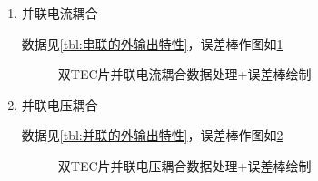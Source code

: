 \documentclass[dvipsnames, svgnames,a4paper,11pt]{article}
\begin{document}
        \begin{enumerate}


            \item 并联电流耦合

                数据见\cref{tbl:串联的外输出特性}，误差棒作图如\cref{fig:双TEC片并联电流耦合数据处理}


                \begin{figure}[htbp]
                    \centering
                    \hfill
                    \caption{双TEC片并联电流耦合数据处理+误差棒绘制}
                    \label{fig:双TEC片并联电流耦合数据处理}
                \end{figure}


            \item 并联电压耦合
            
                数据见\cref{tbl:并联的外输出特性}，误差棒作图如\cref{fig:双TEC片并联电压耦合数据处理}

                
                \begin{figure}[htbp]
                    \centering
                    \hfill
                    \caption{双TEC片并联电压耦合数据处理+误差棒绘制}
                    \label{fig:双TEC片并联电压耦合数据处理}
                \end{figure}


               


        \end{enumerate}
\end{document}
